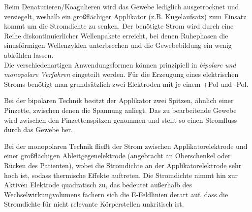 \documentclass[letterpaper,12pt]{article}
\begin{document}
		Beim Denaturieren/Koagulieren wird das Gewebe lediglich ausgetrocknet und versiegelt, weshalb ein  großflächiger Applikator (z.B. Kugelaufsatz) zum Einsatz kommt um die Stromdichte zu senken. Der benötigte Strom wird durch eine Reihe diskontinuierlicher Wellenpakete erreicht, bei denen Ruhephasen die sinusförmigen Wellenzyklen unterbrechen und die Gewebebildung ein wenig abkühlen lassen.\\
		
		Die verschiedenartigen Anwendungsformen können prinzipiell in \emph{bipolare und monopolare Verfahren} eingeteilt werden. Für die Erzeugung eines elektrischen Stroms benötigt man grundsätzlich zwei Elektroden mit je einem +Pol und -Pol. 
		
		Bei der bipolaren Technik besitzt der Applikator zwei Spitzen, ähnlich einer Pinzette, zwischen denen die Spannung anliegt. Das zu bearbeitende Gewebe wird zwischen den Pinzettenspitzen genommen und stellt so einen Stromfluss durch das Gewebe her. 
		
		Bei der monopolaren Technik fließt der Strom zwischen Applikatorelektrode und einer großflächigen Ableitgegenelektrode (angebracht an Oberschenkel oder Rücken des Patienten), wobei die Stromdichte an der Applikatorelektrode sehr hoch ist, sodass thermische Effekte auftreten.
		Die Stromdichte nimmt hin zur Aktiven Elektrode quadratisch zu, das bedeutet außerhalb des Wechselwirkungvolumens fächern sich die E-Feldlinien derart auf, dass die Stromdichte für nicht relevante Körperstellen unkritisch ist.
			
		
\end{document}
